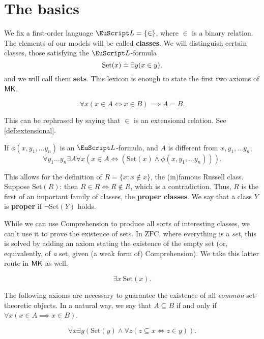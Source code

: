 \documentclass[twoside,openright,titlepage,numbers=noenddot,%
               headinclude,footinclude,cleardoublepage=empty,abstract=on,
               BCOR=23mm,paper=letter,fontsize=11pt
               ]{scrreprt}
\begin{document}
\section{The basics}
We fix a first-order language $\L = \{\in\}$, where $\in$ is a binary relation. The elements of our models will be called \textbf{classes}. We will distinguish certain classes, those satisfying the $\L$-formula
\[ \mathrm{Set}(x) \hskip1mm\dot{=}\hskip1mm \exists y(x \in y), \]
and we will call them \textbf{sets}. This lexicon is enough to state the first two axioms of $\mathsf{MK}$.
\begin{axiom}[Extensionality]
    \[ \forall x(x \in A \iff x \in B) \implies A = B. \]
\end{axiom}
\begin{remark}
    This can be rephrased by saying that $\in$ is an extensional relation. See \ref{def:extensional}.
\end{remark}
\begin{axiom}[Comprehension]
    If $\phi(x, y_1, \dots y_n)$ is an $\L$-formula, and $A$ is different from $x, y_1, \dots y_n$,
    \[ \forall y_1 \dots y_n \exists A \forall x (x \in A \iff (\mathrm{Set}(x) \land \phi(x, y_1, \dots y_n))). \]
\end{axiom}
\begin{remark}
    This allows for the definition of $R = \{x: x \notin x\}$, the (in)famous Russell class. Suppose $\mathrm{Set}(R)$: then $R \in R \iff R \notin R$, which is a contradiction. Thus, $R$ is the first of an important family of classes, the \textbf{proper classes}. We say that a class $Y$ is \textbf{proper} if $\neg \mathrm{Set}(Y)$ holds.
\end{remark}
While we can use Comprehension to produce all sorts of interesting classes, we can't use it to prove the existence of sets. In $\mathrm{ZFC}$, where everything is a \textit{set}, this is solved by adding an axiom stating the existence of the empty set (or, equivalently, of \textit{a} set, given (a weak form of) Comprehension). We take this latter route in $\mathsf{MK}$ as well.
\begin{axiom}
    \[ \exists x \ \mathrm{Set}(x). \]
\end{axiom}
The following axioms are necessary to guarantee the existence of all \textit{common} set-theoretic objects. In a natural way, we say that $A \subseteq B$ if and only if $\forall x (x \in A \implies x \in B)$.
\begin{axiom}[Powerset]
    \[ \forall x \exists y (\mathrm{Set}(y) \land \forall z (z \subseteq x \iff z \in y)). \]
\end{axiom}
\end{document}
